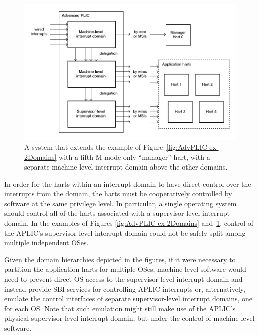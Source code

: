 \begin{figure}[th]
\centerline{\includegraphics[scale=0.55]{AdvPLIC-ex-3Domains.png}}
\caption{%
A {\RISCV} system that extends the example of
Figure~\ref{fig:AdvPLIC-ex-2Domains} with a fifth \mbox{M-mode}-only
``manager'' hart, with a separate machine-level interrupt domain above
the other domains.%
}
\label{fig:AdvPLIC-ex-3Domains}
\end{figure}

\FloatBarrier

\begin{commentary}
In order for the harts within an interrupt domain to have direct
control over the interrupts from the domain, the harts must be
cooperatively controlled by software at the same privilege level.
In particular, a single operating system should control all of the
harts associated with a supervisor-level interrupt domain.
In the examples of Figures \ref{fig:AdvPLIC-ex-2Domains}
and~\ref{fig:AdvPLIC-ex-3Domains}, control of the APLIC's
supervisor-level interrupt domain could not be safely split among
multiple independent OSes.

Given the domain hierarchies depicted in the figures, if it were
necessary to partition the application harts for multiple OSes,
machine-level software would need to prevent direct OS access to the
supervisor-level interrupt domain and instead provide SBI services
for controlling APLIC interrupts or, alternatively, emulate the control
interfaces of separate supervisor-level interrupt domains, one for each
OS.
Note that such emulation might still make use of the APLIC's
physical supervisor-level interrupt domain, but under the control of
machine-level software.
\end{commentary}

